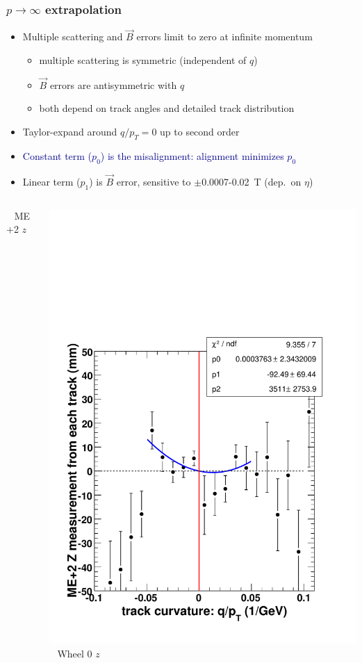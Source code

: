 \documentclass[compress]{beamer}
\begin{document}
\begin{frame}
\frametitle{$p \to \infty$ extrapolation}

\begin{itemize}
\item Multiple scattering and $\vec{B}$ errors limit to zero at infinite momentum
\begin{itemize}
\item multiple scattering is symmetric (independent of $q$)
\item $\vec{B}$ errors are antisymmetric with $q$
\item both depend on track angles and detailed track distribution
\end{itemize}

\item Taylor-expand around $q/p_T = 0$ up to second order
\item \textcolor{darkblue}{Constant term ($p_0$) is the misalignment: alignment minimizes $p_0$}
\item Linear term ($p_1$) is $\vec{B}$ error, sensitive to $\pm$0.0007-0.02~T (dep.\ on $\eta$)
\end{itemize}

\begin{columns}
\mbox{ } \hfill ME$+$2 $z$ \hfill \mbox{ }

\vspace{0.1 cm}
\includegraphics[width=\linewidth]{extrapolation_to_infinite_momentum.pdf}
\mbox{ } \hfill Wheel 0 $z$ \hfill \mbox{ }


\end{columns}
\end{frame}
\end{document}
